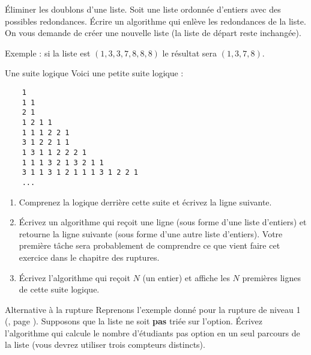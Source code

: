 \begin{Exercice}{Éliminer les doublons d'une liste.}
	Soit une liste ordonnée d'entiers avec des possibles redondances. 
	Écrire un algorithme qui enlève les redondances de la liste. 
	On vous demande de créer une nouvelle liste (la liste de départ reste inchangée).
	
	Exemple : si la liste est $(1, 3, 3, 7, 8, 8, 8)$ 
	le résultat sera $(1, 3, 7, 8)$.
\end{Exercice}

\begin{Exercice}{Une suite logique}
	Voici une petite suite logique :
	
	\begin{minipage}{5cm}
		\small
		\begin{verbatim}
	1
	1 1
	2 1
	1 2 1 1
	1 1 1 2 2 1
	3 1 2 2 1 1
	1 3 1 1 2 2 2 1
	1 1 1 3 2 1 3 2 1 1
	3 1 1 3 1 2 1 1 1 3 1 2 2 1
	...
		\end{verbatim}
	\end{minipage}
	\begin{minipage}{9cm}
		\begin{enumerate}[label=\alph*)]
		\item
			Comprenez la logique derrière cette suite 
			et écrivez la ligne suivante.
		\item
			Écrivez un algorithme qui reçoit une ligne 
			(sous forme d'une liste d'entiers) 
			et retourne la ligne suivante 
			(sous forme d'une autre liste d'entiers).
			Votre première tâche sera probablement de comprendre 
			ce que vient faire cet exercice dans le chapitre des ruptures.
		\item
			Écrivez l'algorithme qui reçoit $N$ (un entier) 
			et affiche les $N$ premières lignes de cette suite logique.	
		\end{enumerate}
	\end{minipage}
\end{Exercice}

\begin{Exercice}{Alternative à la rupture}
	Reprenons l'exemple donné pour la rupture de niveau 1 (, page \pageref{algo:rupt1}).
	Supposons que la liste ne soit \textbf{pas} triée sur l'option.
	Écrivez l'algorithme qui calcule le nombre d'étudiants pas option en un seul parcours de la liste
	(vous devrez utiliser trois compteurs distincts).
\end{Exercice}
